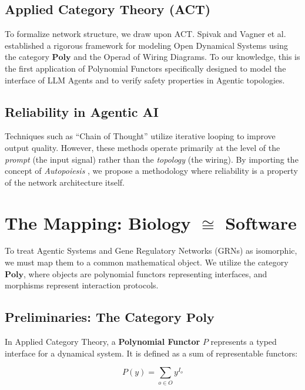 \documentclass[11pt, a4paper]{article}
\newcommand{\Poly}{\mathbf{Poly}}
\begin{document}
\subsection{Applied Category Theory (ACT)}
To formalize network structure, we draw upon ACT. Spivak \cite{spivak2021learners} and Vagner et al. \cite{vagner2015algebras} established a rigorous framework for modeling Open Dynamical Systems using the category $\Poly$ and the Operad of Wiring Diagrams. To our knowledge, this is the first application of Polynomial Functors specifically designed to model the interface of LLM Agents and to verify safety properties in Agentic topologies.

\subsection{Reliability in Agentic AI}
Techniques such as ``Chain of Thought'' \cite{wei2022chain} utilize iterative looping to improve output quality. However, these methods operate primarily at the level of the \textit{prompt} (the input signal) rather than the \textit{topology} (the wiring). By importing the concept of \textit{Autopoiesis} \cite{maturana1980autopoiesis}, we propose a methodology where reliability is a property of the network architecture itself.

\section{The Mapping: Biology $\cong$ Software}

To treat Agentic Systems and Gene Regulatory Networks (GRNs) as isomorphic, we must map them to a common mathematical object. We utilize the category $\Poly$, where objects are polynomial functors representing interfaces, and morphisms represent interaction protocols.

\subsection{Preliminaries: The Category $\Poly$}
In Applied Category Theory, a \textbf{Polynomial Functor} $P$ represents a typed interface for a dynamical system. It is defined as a sum of representable functors:

\begin{equation}
    P(y) = \sum_{o \in O} y^{I_o}
\end{equation}
\end{document}
